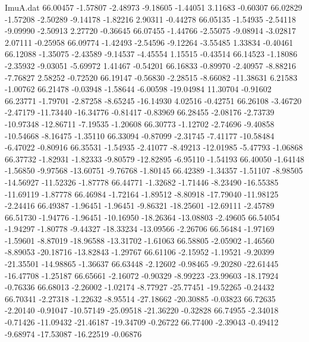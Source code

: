 \begin{filecontents}{ImuA.dat}
  66.00457   -1.57807   -2.48973   -9.18605   -1.44051    3.11683   -0.60307
  66.02829   -1.57208   -2.50289   -9.14178   -1.82216    2.90311   -0.44278
  66.05135   -1.54935   -2.54118   -9.09990   -2.50913    2.27720   -0.36645
  66.07455   -1.44766   -2.55075   -9.08914   -3.02817    2.07111   -0.25958
  66.09774   -1.42493   -2.54596   -9.12264   -3.55485    1.33834   -0.40461
  66.12088   -1.35075   -2.43589   -9.14537   -4.45554    1.15515   -0.43514
  66.14523   -1.18086   -2.35932   -9.03051   -5.69972    1.41467   -0.54201
  66.16833   -0.89970   -2.40957   -8.88216   -7.76827    2.58252   -0.72520
  66.19147   -0.56830   -2.28515   -8.66082  -11.38631    6.21583   -1.00762
  66.21478   -0.03948   -1.58644   -6.00598  -19.04984   11.30704   -0.91602
  66.23771   -1.79701   -2.87258   -8.65245  -16.14930    4.02516   -0.42751
  66.26108   -3.46720   -2.47179  -11.73440  -16.34776   -0.81417   -0.83969
  66.28455   -2.08176   -2.73739  -10.97348  -12.86711   -7.19535   -1.20608
  66.30773   -1.12702   -2.74696   -9.40858  -10.54668   -8.16475   -1.35110
  66.33094   -0.87099   -2.31745   -7.41177  -10.58484   -6.47022   -0.80916
  66.35531   -1.54935   -2.41077   -8.49213  -12.01985   -5.47793   -1.06868
  66.37732   -1.82931   -1.82333   -9.80579  -12.82895   -6.95110   -1.54193
  66.40050   -1.64148   -1.56850   -9.97568  -13.60751   -9.76768   -1.80145
  66.42389   -1.34357   -1.51107   -8.98505  -14.56927  -11.52326   -1.87778
  66.44771   -1.32682   -1.71446   -8.23490  -16.55385  -11.69119   -1.87778
  66.46984   -1.72164   -1.89512   -8.80918  -17.79040  -11.98125   -2.24416
  66.49387   -1.96451   -1.96451   -9.86321  -18.25601  -12.69111   -2.45789
  66.51730   -1.94776   -1.96451  -10.16950  -18.26364  -13.08803   -2.49605
  66.54054   -1.94297   -1.80778   -9.44327  -18.33234  -13.09566   -2.26706
  66.56484   -1.97169   -1.59601   -8.87019  -18.96588  -13.31702   -1.61063
  66.58805   -2.05902   -1.46560   -8.89053  -20.18716  -13.82843   -1.29767
  66.61106   -2.15952   -1.19521   -9.20399  -21.35501  -14.98865   -1.36637
  66.63448   -2.12602   -0.98465   -9.20280  -22.61445  -16.47708   -1.25187
  66.65661   -2.16072   -0.90329   -8.99223  -23.99603  -18.17924   -0.76336
  66.68013   -2.26002   -1.02174   -8.77927  -25.77451  -19.52265   -0.24432
  66.70341   -2.27318   -1.22632   -8.95514  -27.18662  -20.30885   -0.03823
  66.72635   -2.20140   -0.91047  -10.57149  -25.09518  -21.36220   -0.32828
  66.74955   -2.34018   -0.71426  -11.09432  -21.46187  -19.34709   -0.26722
  66.77400   -2.39043   -0.49412   -9.68974  -17.53087  -16.22519   -0.06876

\end{filecontents}
